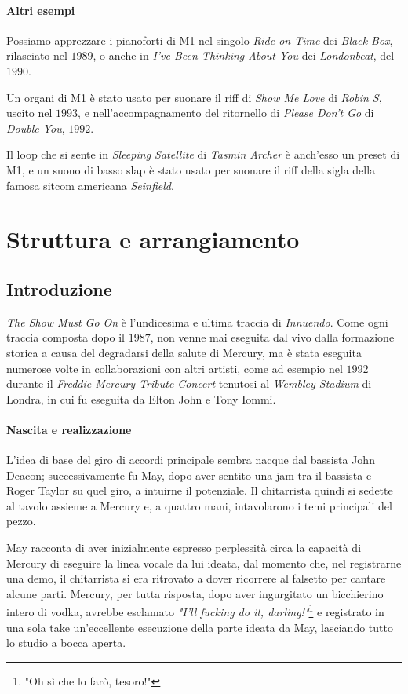 \documentclass[12pt]{article}
\begin{document}
\paragraph{Altri esempi}
Possiamo apprezzare i pianoforti di M1 nel singolo \emph{Ride on Time} dei \emph{Black Box}, rilasciato nel \(1989\), o anche in \emph{I've Been Thinking About You} dei \emph{Londonbeat}, del \(1990\).

Un organi di M1 è stato usato per suonare il riff di \emph{Show Me Love} di \emph{Robin S}, uscito nel \(1993\), e nell'accompagnamento del ritornello di \emph{Please Don't Go} di \emph{Double You}, \(1992\).

Il loop che si sente in \emph{Sleeping Satellite} di \emph{Tasmin Archer} è anch'esso un preset di M1, e un suono di basso slap è stato usato per suonare il riff della sigla della famosa sitcom americana \emph{Seinfield}.

\section{Struttura e arrangiamento}

\subsection{Introduzione}
\emph{The Show Must Go On} è l'undicesima e ultima traccia di \emph{Innuendo}. Come ogni traccia composta dopo il \(1987\), non venne mai eseguita dal vivo dalla formazione storica a causa del degradarsi della salute di Mercury, ma è stata eseguita numerose volte in collaborazioni con altri artisti, come ad esempio nel \(1992\) durante il \emph{Freddie Mercury Tribute Concert} tenutosi al \emph{Wembley Stadium} di Londra, in cui fu eseguita da Elton John e Tony Iommi.

\paragraph{Nascita e realizzazione}
L'idea di base del giro di accordi principale sembra nacque dal bassista John Deacon; successivamente fu May, dopo aver sentito una jam tra il bassista e Roger Taylor su quel giro, a intuirne il potenziale. Il chitarrista quindi si sedette al tavolo assieme a Mercury e, a quattro mani, intavolarono i temi principali del pezzo.

May racconta di aver inizialmente espresso perplessità circa la capacità di Mercury di eseguire la linea vocale da lui ideata, dal momento che, nel registrarne una demo, il chitarrista si era ritrovato a dover ricorrere al falsetto per cantare alcune parti. Mercury, per tutta risposta, dopo aver ingurgitato un bicchierino intero di vodka, avrebbe esclamato \emph{"I'll fucking do it, darling!"}\footnote{"Oh sì che lo farò, tesoro!"} e registrato in una sola take un'eccellente esecuzione della parte ideata da May, lasciando tutto lo studio a bocca aperta.
\end{document}

